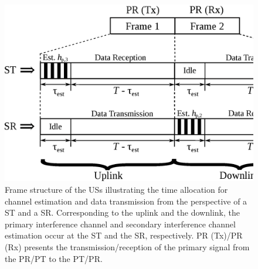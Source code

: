 \begin{figure}[!t]
\centering
\includegraphics[width = \columnwidth]{figures/Frame_Structure}
\caption{Frame structure of the USs illustrating the time allocation for channel estimation and data transmission from the perspective of a ST and a SR. Corresponding to the uplink and the downlink, the primary interference channel and secondary interference channel estimation occur at the ST and the SR, respectively. PR (Tx)/PR (Rx) presents the transmission/reception of the primary signal from the PR/PT to the PT/PR.} 
\label{fig_US:fs}
\end{figure}



